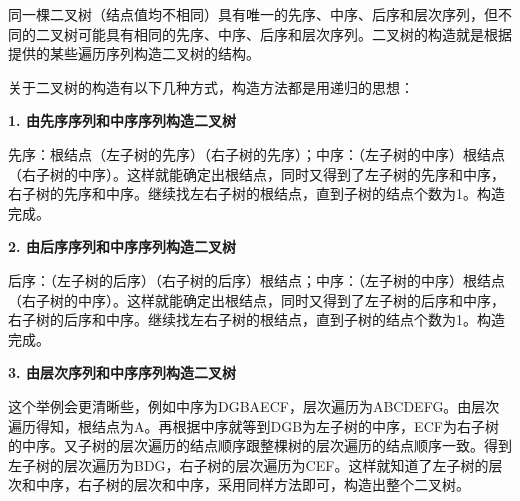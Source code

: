 {同一棵二叉树（结点值均不相同）具有唯一的先序、中序、后序和层次序列，但不同的二叉树可能具有相同的先序、中序、后序和层次序列。{二叉树的构造就是根据提供的某些遍历序列构造二叉树的结构。}}

{关于二叉树的构造有以下几种方式，构造方法都是用递归的思想：}

{\textbf{1. 由先序序列和中序序列构造二叉树}}

{{先序：根结点（左子树的先序）（右子树的先序）；中序：（左子树的中序）根结点（右子树的中序）。这样就能确定出根结点，同时又得到了左子树的先序和中序，右子树的先序和中序。继续找左右子树的根结点，直到子树的结点个数为1。构造完成。}\\
}

{\textbf{2. 由后序序列和中序序列构造二叉树}}

{{后序：（左子树的后序）（右子树的后序）根结点；中序：（左子树的中序）根结点（右子树的中序）。这样就能确定出根结点，同时又得到了左子树的后序和中序，右子树的后序和中序。继续找左右子树的根结点，直到子树的结点个数为1。构造完成。}\\
}

{\textbf{3. 由层次序列和中序序列构造二叉树}}

{这个举例会更清晰些，例如中序为DGBAECF，层次遍历为ABCDEFG。由层次遍历得知，根结点为A。再根据中序就等到DGB为左子树的中序，ECF为右子树的中序。又子树的层次遍历的结点顺序跟整棵树的层次遍历的结点顺序一致。得到左子树的层次遍历为BDG，右子树的层次遍历为CEF。这样就知道了左子树的层次和中序，右子树的层次和中序，采用同样方法即可，构造出整个二叉树。}
